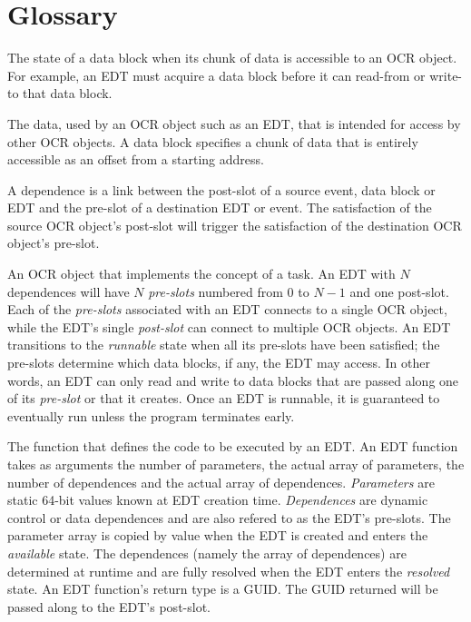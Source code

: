 %
%
%
\section{Glossary}
\label{sec:Glossary}
\glossarydefstart
The state of a data block when its chunk of data is accessible to an
OCR object. For example, an EDT must acquire a data block before it
can read-from or write-to that data block.
\glossarydefend

\glossarydefstart
The data, used by an OCR object such as an EDT, that is intended for
access by other OCR objects. A data block specifies
a chunk of data that is entirely accessible as an offset from a starting address.
\glossarydefend

\glossarydefstart
A dependence is a link between the post-slot of a source event,
data block or EDT and the pre-slot of a destination EDT or event. The
satisfaction of the source OCR object's post-slot will trigger the
satisfaction of the destination OCR object's pre-slot.
\glossarydefend

\glossarydefstart
An OCR object that implements the concept of a task. An EDT with $N$
dependences will have $N$ \emph{pre-slots} numbered from $0$ to $N-1$
and one post-slot.
Each of the \emph{pre-slots} associated with an EDT connects to a
single OCR object, while the EDT’s single \emph{post-slot} can connect
to multiple OCR objects. An EDT transitions to the \emph{runnable} state when all its
pre-slots have been satisfied; the pre-slots determine which
data blocks, if any, the EDT may access. In other words, an EDT can
only read and write to data blocks that are passed along one of its
\emph{pre-slot} or that it creates. Once an EDT is runnable, it is guaranteed to
eventually run unless the program terminates early.
\glossarydefend

\glossarydefstart
The function that defines the code to be executed by an EDT. An EDT function
takes as arguments the number of parameters, the actual array of
parameters, the number of dependences and the actual array of
dependences. \emph{Parameters} are static 64-bit values known at EDT
creation time. \emph{Dependences} are dynamic control or data
dependences and are also refered to as the EDT's pre-slots. The
parameter array is copied by value when the EDT is created and enters
the \emph{available} state. The dependences (namely the array of dependences) are
determined at runtime and are fully resolved when the EDT enters the
\emph{resolved} state. An EDT function's return type is a GUID. The GUID returned
will be passed along to the EDT's post-slot.
\glossarydefend

